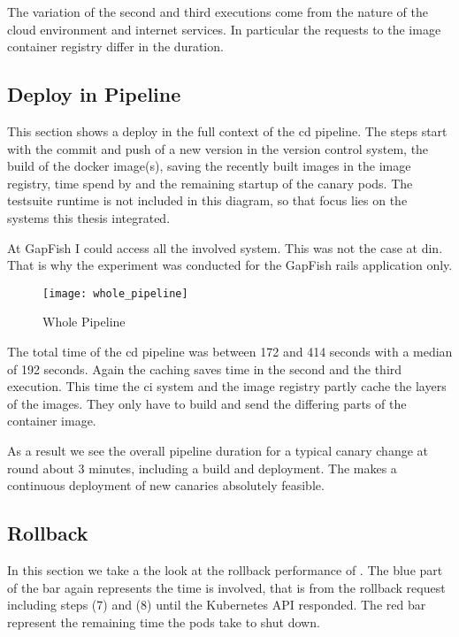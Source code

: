 The variation of the second and third executions come from the nature of the cloud
environment and internet services. In particular the requests to the image container
registry differ in the duration.

\subsection{Deploy in Pipeline}

This section shows a deploy in the full context of the \gls{cd} pipeline. The steps start
with the commit and push of a new version in the version control system, the build of the
docker image(s), saving the recently built images in the image registry, time spend by
\deployer and the remaining startup of the canary pods. The testsuite runtime is not
included in this diagram, so that focus lies on the systems this thesis integrated.

At GapFish I could access all the involved system. This was not the case at \gls{din}. That is
why the experiment was conducted for the GapFish rails application only.

\begin{figure}[htbp]
  \centering
  \texttt{[image: whole\_pipeline]}
  \caption[Metric Comparison]{Whole Pipeline}
  \label{fig:whole pipeline}
\end{figure}

The total time of the \gls{cd} pipeline was between 172 and 414 seconds with a median of
192 seconds. Again the caching saves time in the second and the third execution. This time
the \gls{ci} system and the image registry partly cache the layers of the images. They
only have to build and send the differing parts of the container image.

As a result we see the overall pipeline duration for a typical canary change at round
about 3 minutes, including a build and deployment. The makes a continuous deployment of
new canaries absolutely feasible.

\subsection{Rollback}

In this section we take a the look at the rollback performance of \deployer. The blue part
of the bar again represents the time \deployer is involved, that is from the rollback
request including steps (7) and (8) until the Kubernetes API responded. The red bar
represent the remaining time the pods take to shut down.


